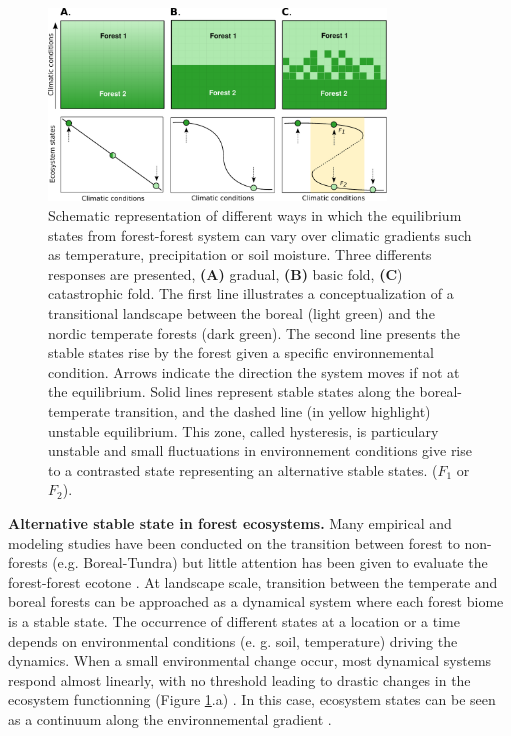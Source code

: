 \begin{figure}[t]
	\begin{center}
	\includegraphics[width=0.8\textwidth]{fig/states.pdf}
	\end{center}
	\caption{Schematic representation of different ways in which the equilibrium
	states from forest-forest system can vary over climatic gradients such as temperature, precipitation
	or soil moisture. Three differents responses are presented,
	\textbf{(A)} gradual, \textbf{(B)} basic fold, \textbf{(C}) catastrophic fold.
	The first line illustrates a conceptualization of a transitional landscape
	between the boreal (light green) and the nordic temperate forests (dark
	green). The second line presents the stable states rise by the forest
	given a specific environnemental condition. Arrows indicate the
	direction the system moves if not at the equilibrium. Solid lines represent stable states along the boreal-temperate
	transition, and the dashed line (in yellow highlight) unstable equilibrium. This zone,
	called hysteresis, is particulary unstable and small fluctuations in
	environnement conditions give rise to a contrasted state representing an
	alternative stable states. ($F_1$ or $F_2$).}
	\label{fig1}
\end{figure}


\textbf{Alternative stable state in forest ecosystems.} Many empirical and
modeling studies have been conducted on the transition between forest to non-
forests (e.g. Boreal-Tundra)
\cite{Scheffer2012,Scheffer2001,Hirota2011,Messaoud2007} but little attention
has been given to evaluate the forest-forest ecotone
\cite{Goldblum2010,Graignic2013}. At landscape scale, transition between  the
temperate and boreal forests can be approached as a dynamical system where
each forest biome is a stable state. The occurrence of different states at a
location or a time depends on environmental conditions (e. g. soil,
temperature) driving the dynamics. When a small environmental change occur,
most dynamical systems respond almost linearly, with no threshold leading to
drastic changes in the ecosystem functionning (Figure \ref{fig1}.a)
\cite{Scheffer2001,Scheffer2009}. In this case, ecosystem states can be seen as a
continuum along the environnemental gradient
\cite{Scheffer2001,Scheffer2009,scheffer2009critical}.


